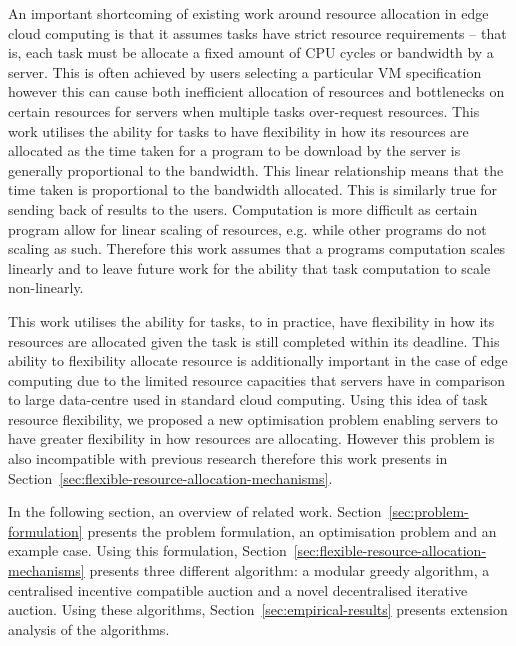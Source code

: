 An important shortcoming of existing work around resource allocation in edge cloud computing is that it assumes tasks have
strict resource requirements -- that is, each task must be allocate a fixed amount of CPU cycles or bandwidth by a
server. This is often achieved by users selecting a particular VM specification however this can cause both inefficient 
allocation of resources and bottlenecks on certain resources for servers when multiple tasks over-request resources. 
This work utilises the ability for tasks to have flexibility in how its resources are allocated as the time taken 
for a program to be download by the server is generally proportional to the bandwidth. This linear relationship means that 
the time taken is proportional to the bandwidth allocated. This is similarly true for sending back of results to the users.
Computation is more difficult as certain program allow for linear scaling of resources, e.g. while other programs do not 
scaling as such. Therefore this work assumes that a programs computation scales linearly and to leave future work for the
ability that task computation to scale non-linearly. 

This work utilises the ability for tasks, to in practice, have flexibility in how its resources are allocated given
the task is still completed within its deadline. This ability to flexibility allocate resource is additionally important
in the case of edge computing due to the limited resource capacities that servers have in comparison to large data-centre
used in standard cloud computing. Using this idea of task resource flexibility, we proposed a new optimisation problem
enabling servers to have greater flexibility in how resources are allocating. However this problem is also incompatible
with previous research therefore this work presents in Section~\ref{sec:flexible-resource-allocation-mechanisms}. 

In the following section, an overview of related work. Section~\ref{sec:problem-formulation} presents the problem 
formulation, an optimisation problem and an example case. Using this formulation, Section~\ref{sec:flexible-resource-allocation-mechanisms} presents three different algorithm: a modular greedy algorithm,
a centralised incentive compatible auction and a novel decentralised iterative auction. Using these algorithms, 
Section~\ref{sec:empirical-results} presents extension analysis of the algorithms. 
